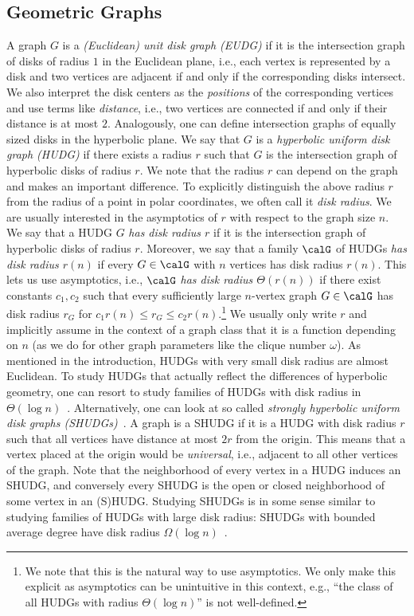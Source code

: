 \subsection{Geometric Graphs}
%
A graph $G$ is a \emph{(Euclidean) unit disk graph (EUDG)} if it is the intersection graph of disks of radius $1$ in the Euclidean plane, i.e., each vertex is represented by a disk and two vertices are adjacent if and only if the corresponding disks intersect.
We also interpret the disk centers as the \emph{positions} of the corresponding vertices and use terms like \emph{distance}, i.e., two vertices are connected if and only if their distance is at most $2$.
Analogously, one can define intersection graphs of equally sized disks in the hyperbolic plane.
We say that $G$ is a \emph{hyperbolic uniform disk graph (HUDG)} if there exists a radius $r$ such that $G$ is the intersection graph of hyperbolic disks of radius $r$.
We note that the radius $r$ can depend on the graph and makes an important difference.
To explicitly distinguish the above radius $r$ from the radius of a point in polar coordinates, we often call it \emph{disk radius}.
%
We are usually interested in the asymptotics of $r$ with respect to the graph size $n$.
We say that a HUDG $G$ \emph{has disk radius $r$} if it is the intersection graph of hyperbolic disks of radius $r$.
Moreover, we say that a family $\calG$ of HUDGs \emph{has disk radius $r(n)$} if every $G \in \calG$ with $n$ vertices has disk radius $r(n)$.
This lets us use asymptotics, i.e., $\calG$ \emph{has disk radius $\Theta(r(n))$} if there exist constants $c_1, c_2$ such that every sufficiently large $n$-vertex graph $G \in \calG$ has disk radius $r_G$ for $c_1 r(n) \le r_G \le c_2 r(n)$.\footnote{We note that this is the natural way to use asymptotics.
  We only make this explicit as asymptotics can be unintuitive in this context, e.g., \enquote{the class of all HUDGs with radius $\Theta(\log n)$} is not well-defined.}
We usually only write $r$ and implicitly assume in the context of a graph class that it is a function depending on $n$ (as we do for other graph parameters like the clique number $\omega$).
%
As mentioned in the introduction, HUDGs with very small disk radius are almost Euclidean.
To study HUDGs that actually reflect the differences of hyperbolic geometry, one can resort to study families of HUDGs with disk radius in $\Theta(\log n)$~\cite{Struc_Indep_Hyper_Unifor_Disk_Graph-Blaesius25}.
Alternatively, one can look at so called \emph{strongly hyperbolic uniform disk graphs (SHUDGs)}~\cite{blasius_strongly_2023}.
A graph is a SHUDG if it is a HUDG with disk radius $r$ such that all vertices have distance at most $2r$ from the origin.
This means that a vertex placed at the origin would be \emph{universal}, i.e., adjacent to all other vertices of the graph.
Note that the neighborhood of every vertex in a HUDG induces an SHUDG, and conversely every SHUDG is the open or closed neighborhood of some vertex in an (S)HUDG.
Studying SHUDGs is in some sense similar to studying families of HUDGs with large disk radius: SHUDGs with bounded average degree have disk radius $\Omega(\log n)$~\cite{blasius_strongly_2023}.
%
%
% 
%
%
%
